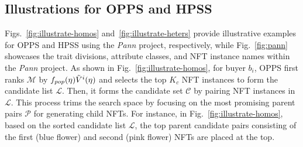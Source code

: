 \documentclass[conference]{IEEEtran}
\newcommand{\1}[1]{\mathds{1}\left[#1\right]}
\theoremstyle{plain}
\newcommand{\homos}{OPPS\xspace}
\newcommand{\heters}{HPSS\xspace}
\begin{document}
{\subsection{Illustrations for \homos and \heters}
\label{appsubsec:breeding-utility}

    Figs.~\ref{fig:illustrate-homos} and~\ref{fig:illustrate-heters} provide illustrative examples for \homos and \heters using the \emph{Pann} project, respectively, while Fig.~\ref{fig:pann} showcases the trait divisions, attribute classes, and NFT instance names within the \emph{Pann} project. As shown in Fig.~\ref{fig:illustrate-homos}, for buyer $b_i$, \homos first ranks $\mathcal{M}$ by $f_{pop}(\eta)\Tilde{V}^i(\eta)$ and selects the top $K_c$ NFT instances to form the candidate list $\mathcal{L}$. Then, it forms the candidate set $\mathcal{C}$ by pairing NFT instances in $\mathcal{L}$. This process trims the search space by focusing on the most promising parent pairs $\mathcal{P}$ for generating child NFTs. For instance, in Fig.~\ref{fig:illustrate-homos}, based on the sorted candidate list $\mathcal{L}$, the top parent candidate pairs consisting of the first (blue flower) and second (pink flower) NFTs are placed at the top.
    
}
\end{document}
